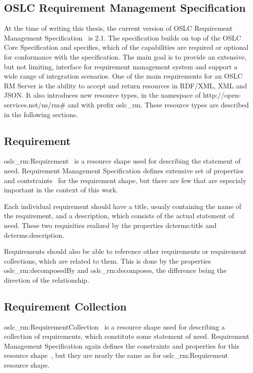 \subsection{OSLC Requirement Management Specification}
At the time of writing this thesis, the current version of OSLC Requirement Management Specification \cite{oslc_requirement_management_specification} is 2.1. The specification builds on top of the OSLC Core Specification and specifies, which of the capabilities are required or optional for conformance with the specification. The main goal is to provide an extensive, but not limiting, interface for requirement management system and support a wide range of integration scenarios. One of the main requirements for an OSLC RM Server is the ability to accept and return resources in RDF/XML, XML and JSON. It also introduces new resource types, in the namespace of http://open-services.net/ns/rm\# and with prefix oslc\_rm. These resource types are described in the following sections.

\subsection*{Requirement}
oslc\_rm:Requirement \cite{oslc_rm_requirement} is a resource shape used for describing the statement of need.  Requirement Management Specification defines extensive set of properties and contstraints \cite{oslc_rm_requirement_constraints} for the requirement shape, but there are few that are especialy important in the context of this work. 

Each individual requirement should have a title, usualy containing the name of the requirement, and a description, which consists of the actual statement of need. These two requisities realized by the properties dcterms:title and dcterms:description.

Requirements should also be able to reference other requirements or requirement collections, which are related to them. This is done by the properties oslc\_rm:decomposedBy and oslc\_rm:decomposes, the difference being the direction of the relationship.

\subsection*{Requirement Collection}
oslc\_rm:RequirementCollection \cite{oslc_rm_requirement_collection} is a resource shape used for describing a collection of requirements, which constitute some statement of need. Requirement Management Specification again defines the constraints and properties for this resource shape \cite{oslc_rm_requirement_collection_constraints}, but they are nearly the same as for oslc\_rm:Requirement resource shape.

